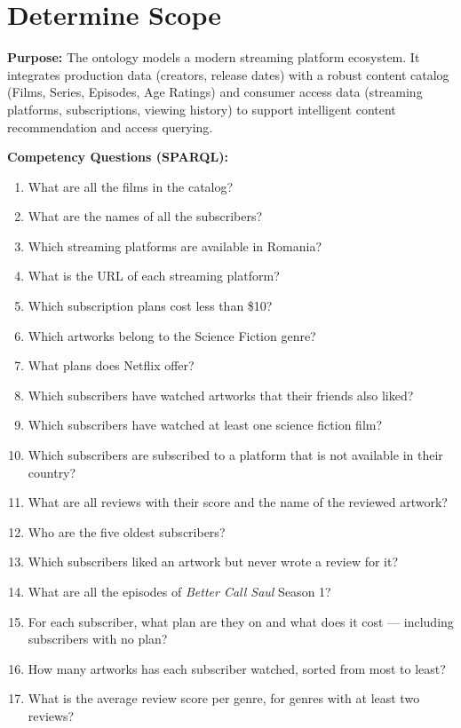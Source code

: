 \chapter{Determine Scope}

\textbf{Purpose:} The ontology models a modern streaming platform ecosystem. It integrates production data (creators, release dates) with a robust content catalog (Films, Series, Episodes, Age Ratings) and consumer access data (streaming platforms, subscriptions, viewing history) to support intelligent content recommendation and access querying.

\vspace{0.5cm}
\noindent\textbf{Competency Questions (SPARQL):}
\begin{enumerate}
    \item What are all the films in the catalog?
    \item What are the names of all the subscribers?
    \item Which streaming platforms are available in Romania?
    \item What is the URL of each streaming platform?
    \item Which subscription plans cost less than \$10?
    \item Which artworks belong to the Science Fiction genre?
    \item What plans does Netflix offer?
    \item Which subscribers have watched artworks that their friends also liked?
    \item Which subscribers have watched at least one science fiction film?
    \item Which subscribers are subscribed to a platform that is not available in their country?
    \item What are all reviews with their score and the name of the reviewed artwork?
    \item Who are the five oldest subscribers?
    \item Which subscribers liked an artwork but never wrote a review for it?
    \item What are all the episodes of \textit{Better Call Saul} Season 1?
    \item For each subscriber, what plan are they on and what does it cost — including subscribers with no plan?
    \item How many artworks has each subscriber watched, sorted from most to least?
    \item What is the average review score per genre, for genres with at least two reviews?

\end{enumerate}
